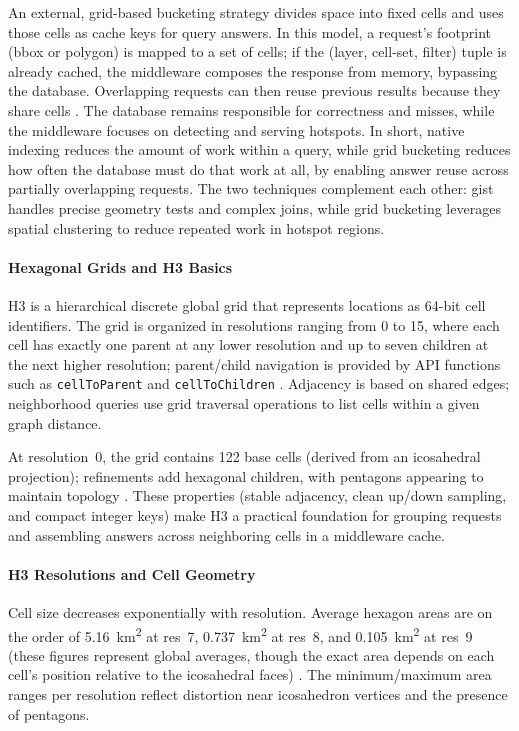 An external, grid-based bucketing strategy divides space into fixed cells and uses those cells as cache keys for query answers. In this model, a request's footprint (\ac{bbox} or polygon) is mapped to a set of cells; if the (layer, cell-set, filter) tuple is already cached, the middleware composes the response from memory, bypassing the database. Overlapping requests can then reuse previous results because they share cells \cite{Winter2021_GeoBlocks}. The database remains responsible for correctness and misses, while the middleware focuses on detecting and serving hotspots. In short, native indexing reduces the amount of work within a query, while grid bucketing reduces how often the database must do that work at all, by enabling answer reuse across partially overlapping requests. The two techniques complement each other: \ac{gist} handles precise geometry tests and complex joins, while grid bucketing leverages spatial clustering to reduce repeated work in hotspot regions.

\paragraph{Hexagonal Grids and H3 Basics}
H3 is a hierarchical discrete global grid that represents locations as 64-bit cell identifiers. The grid is organized in resolutions ranging from 0 to 15, where each cell has exactly one parent at any lower resolution and up to seven children at the next higher resolution; parent/child navigation is provided by API functions such as \texttt{cellToParent} and \texttt{cellToChildren} \cite{H3_API_Hierarchy}. Adjacency is based on shared edges; neighborhood queries use grid traversal operations to list cells within a given graph distance.

At resolution~0, the grid contains 122 base cells (derived from an icosahedral projection); refinements add hexagonal children, with pentagons appearing to maintain topology \cite{H3_Core_Overview}. These properties (stable adjacency, clean up/down sampling, and compact integer keys) make H3 a practical foundation for grouping requests and assembling answers across neighboring cells in a middleware cache.

\paragraph{H3 Resolutions and Cell Geometry}
Cell size decreases exponentially with resolution. Average hexagon areas are on the order of \SI{5.16}{\kilo\meter\squared} at res~7, \SI{0.737}{\kilo\meter\squared} at res~8, and \SI{0.105}{\kilo\meter\squared} at res~9 (these figures represent global averages, though the exact area depends on each cell's position relative to the icosahedral faces) \cite{H3_Core_ResTable_Area}. The minimum/maximum area ranges per resolution reflect distortion near icosahedron vertices and the presence of pentagons.

